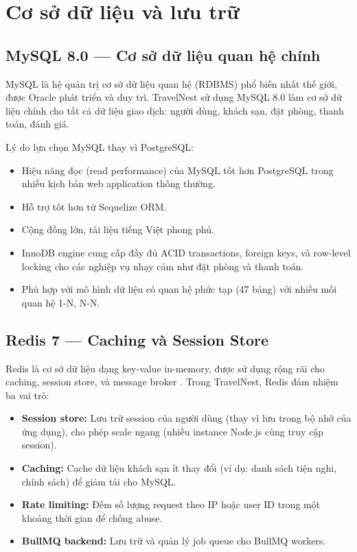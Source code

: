 \documentclass[13pt,a4paper,twoside]{report}
\begin{document}
\section{Cơ sở dữ liệu và lưu trữ}

\subsection{MySQL 8.0 --- Cơ sở dữ liệu quan hệ chính}

MySQL là hệ quản trị cơ sở dữ liệu quan hệ (RDBMS) phổ biến nhất thế giới, được Oracle phát triển và duy trì. TravelNest sử dụng MySQL 8.0 làm cơ sở dữ liệu chính cho tất cả dữ liệu giao dịch: người dùng, khách sạn, đặt phòng, thanh toán, đánh giá.

Lý do lựa chọn MySQL thay vì PostgreSQL:

\begin{itemize}
  \item Hiệu năng đọc (read performance) của MySQL tốt hơn PostgreSQL trong nhiều kịch bản web application thông thường.
  \item Hỗ trợ tốt hơn từ Sequelize ORM.
  \item Cộng đồng lớn, tài liệu tiếng Việt phong phú.
  \item InnoDB engine cung cấp đầy đủ ACID transactions, foreign keys, và row-level locking cho các nghiệp vụ nhạy cảm như đặt phòng và thanh toán.
  \item Phù hợp với mô hình dữ liệu có quan hệ phức tạp (47 bảng) với nhiều mối quan hệ 1-N, N-N.
\end{itemize}

\subsection{Redis 7 --- Caching và Session Store}

Redis là cơ sở dữ liệu dạng key-value in-memory, được sử dụng rộng rãi cho caching, session store, và message broker \cite{redis2024docs}. Trong TravelNest, Redis đảm nhiệm ba vai trò:

\begin{itemize}
  \item \textbf{Session store:} Lưu trữ session của người dùng (thay vì lưu trong bộ nhớ của ứng dụng), cho phép scale ngang (nhiều instance Node.js cùng truy cập session).
  \item \textbf{Caching:} Cache dữ liệu khách sạn ít thay đổi (ví dụ: danh sách tiện nghi, chính sách) để giảm tải cho MySQL.
  \item \textbf{Rate limiting:} Đếm số lượng request theo IP hoặc user ID trong một khoảng thời gian để chống abuse.
  \item \textbf{BullMQ backend:} Lưu trữ và quản lý job queue cho BullMQ workers.
\end{itemize}
\end{document}
